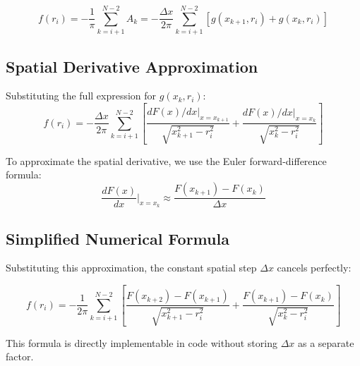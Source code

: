 \documentclass[11pt,a4paper]{article}
\begin{document}
\begin{equation}
f(r_i) = -\frac{1}{\pi}\sum_{k=i+1}^{N-2} A_k = -\frac{\Delta x}{2\pi}\sum_{k=i+1}^{N-2} \left[ g(x_{k+1}, r_i) + g(x_k, r_i) \right]
\end{equation}

\subsection{Spatial Derivative Approximation}

Substituting the full expression for $g(x_k, r_i)$:
\begin{equation}
f(r_i) = -\frac{\Delta x}{2\pi}\sum_{k=i+1}^{N-2} \left[ \frac{dF(x)/dx\big|_{x=x_{k+1}}}{\sqrt{x_{k+1}^2 - r_i^2}} + \frac{dF(x)/dx\big|_{x=x_k}}{\sqrt{x_k^2 - r_i^2}} \right]
\end{equation}

To approximate the spatial derivative, we use the Euler forward-difference formula:
\begin{equation}
\frac{dF(x)}{dx}\bigg|_{x=x_k} \approx \frac{F(x_{k+1}) - F(x_k)}{\Delta x}
\end{equation}

\subsection{Simplified Numerical Formula}

Substituting this approximation, the constant spatial step $\Delta x$ cancels perfectly:

\begin{equation}
\boxed{f(r_i) = -\frac{1}{2\pi}\sum_{k=i+1}^{N-2} \left[ \frac{F(x_{k+2}) - F(x_{k+1})}{\sqrt{x_{k+1}^2 - r_i^2}} + \frac{F(x_{k+1}) - F(x_k)}{\sqrt{x_k^2 - r_i^2}} \right]}
\end{equation}

This formula is directly implementable in code without storing $\Delta x$ as a separate factor.
\end{document}

